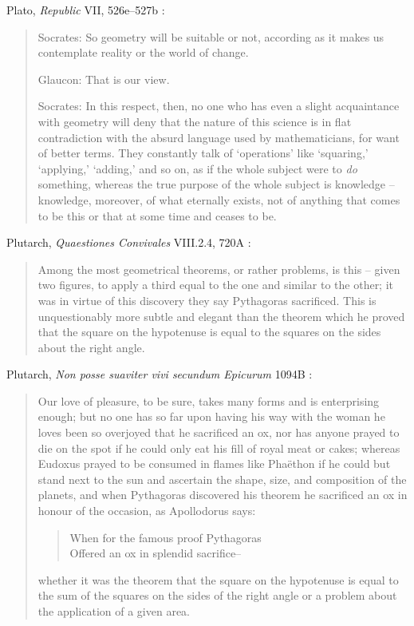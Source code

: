 \documentclass{article}
\begin{document}
Plato, {\em Republic} VII, 526e--527b \cite[p.~244]{cornfordrepublic}:

\begin{quote}
Socrates: So geometry 
will be suitable or not, according as it makes us contemplate reality
or the world of change.

Glaucon: That is our view.

Socrates: In this respect, then, no one who has even a slight acquaintance
with geometry will deny that the nature of this science is in flat
contradiction with the absurd language used by mathematicians,
for want of better terms. They constantly talk of `operations' like
`squaring,'  `applying,'  `adding,'
and so on, as if the whole subject were to
{\em do} something, whereas the true purpose of the whole subject is
knowledge -- knowledge, moreover, of what eternally exists, not of
anything that comes to be this or that at some time and ceases to be.
\end{quote}







Plutarch, {\em Quaestiones Convivales} VIII.2.4, 720A \cite[p.~177]{LCL335}:

\begin{quote}
Among the most geometrical theorems, or rather
problems, is this -- given two figures, to apply a third
equal to the one and similar to the other; it was
in virtue of this discovery they say Pythagoras
sacrificed. This is unquestionably more subtle and
elegant than the theorem which he proved that the
square on the hypotenuse is equal to the squares on
the sides about the right angle.
\end{quote}

Plutarch, {\em Non posse suaviter vivi secundum Epicurum} 1094B \cite[pp.~65--67]{LCL428}:

\begin{quote}
Our love of pleasure, to be sure, takes many forms and is enterprising enough;
but no one has so far upon having his way with the
woman he loves been so overjoyed that he sacrificed
an ox, nor has anyone prayed to die on the spot if he
could only eat his fill of royal meat or cakes; whereas
Eudoxus prayed to be consumed in flames like
Pha\"ethon if he could but stand next to the sun and
ascertain the shape, size, and composition of the
planets, and when Pythagoras discovered his theorem
he sacrificed an ox in honour of the occasion, as 
Apollodorus says:
\begin{quote}
When for the famous proof Pythagoras\\
Offered an ox in splendid sacrifice--
\end{quote}
whether it was the theorem that the square on the
hypotenuse is equal to the sum of the squares on 
the sides of the right  angle  or a problem about the
application of a given area.
\end{quote}
\end{document}
